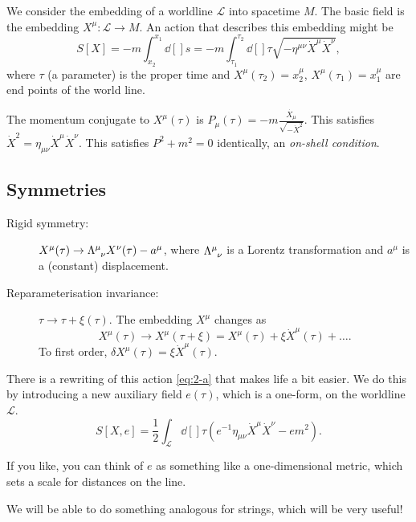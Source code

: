 We consider the embedding of a worldline $\mathcal{L}$  into spacetime $M$.
The basic field is the embedding  $X^{\mu} \colon \mathcal{L} \to M$. An action that describes this embedding might be
\begin{equation}
  \label{eq:2-a}
  S[X] = -m \int_{x_2}^{x_1} \dd[]{s} = -m \int_{\tau_1}^{\tau_2} \dd[]{\tau} \sqrt{-\eta^{\mu\nu} \dot{X}^{\mu} \dot{X}^{\nu}},
\end{equation}
where $\tau$ (a parameter) is the proper time and $X^{\mu}(\tau_2) = x_2^{\mu}$, $X^{\mu}(\tau_1) = x_1^{\mu}$ are end points of the world line.
\begin{figure}[tbhp]
  \centering
  \def\svgwidth{0.35\columnwidth}
  
  \caption{}
  \label{fig:l2f1}
\end{figure}

The momentum conjugate to $X^{\mu}(\tau)$  is $P_{\mu}(\tau) = - m \frac{\dot{X_{\mu}}}{\sqrt{- \dot{X}^2}}$. This satisfies $\dot{X}^2 = \eta_{\mu\nu} \dot{X}^{\mu} \dot{X}^{\nu}$. 
This satisfies $P^2 + m^2 = 0$ identically, an \emph{on-shell condition}.

\subsection*{Symmetries}%

\begin{description}
  \item[Rigid symmetry:] $X^{\mu}(\tau) \to \Lambda\indices{^{\mu}_{\nu}} X^{\nu}(\tau) - a^{\mu}$, where $\Lambda\indices{^{\mu}_{\nu}}$ is a Lorentz transformation and $a^{\mu}$ is a (constant) displacement.
  \item[Reparameterisation invariance:] $\tau \to \tau + \xi(\tau)$. The embedding $X^{\mu}$ changes as 
    \begin{equation}
      X^{\mu}(\tau) \to X^{\mu}(\tau + \xi) = X^{\mu}(\tau) + \xi \dot{X}^{\mu}(\tau) + \dots.
    \end{equation}
    To first order, $\delta X^{\mu}(\tau) = \xi \dot{X}^{\mu} (\tau)$.
\end{description}

There is a rewriting of this action \eqref{eq:2-a} that makes life a bit easier.
We do this by introducing a new auxiliary field $e(\tau)$, which is a one-form, on the worldline $\mathcal{L}$.
\begin{equation}
  \label{eq:2-b}
  S[X, e] = \frac{1}{2} \int_{\mathcal{L}} \dd[]{\tau} \left( e^{-1} \eta_{\mu\nu} \dot{X}^{\mu} \dot{X}^{\nu} - em^2 \right).
\end{equation}
\begin{leftbar}
  If you like, you can think of $e$ as something like a one-dimensional metric, which sets a scale for distances on the line.
\end{leftbar}
\begin{leftbar}
  We will be able to do something analogous for strings, which will be very useful!
\end{leftbar}

